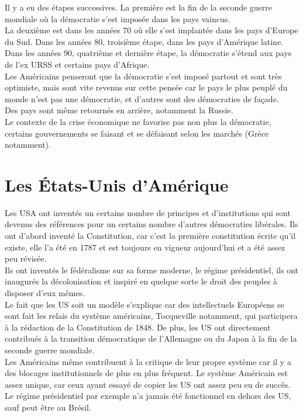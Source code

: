 \documentclass[10pt, a4paper, openany]{book}
\begin{document}
Il y a eu des étapes successives. La première est la fin de la seconde guerre mondiale où la démocratie s'est imposée dans les pays vaincus. \\
La deuxième est dans les années 70 où elle s'est implantée dans les pays d'Europe du Sud. Dans les années 80, troisième étape, dans les pays d'Amérique latine. Dans les années 90, quatrième et dernière étape, la démocratie s'étend aux pays de l'ex URSS et certains pays d'Afrique. \\
Les Américains penseront que la démocratie s'est imposé partout et sont très optimiste, mais sont vite revenus sur cette pensée car le pays le plus peuplé du monde n'est pas une démocratie, et d'autres sont des démocraties de façade. \\
Des pays sont même retournés en arrière, notamment la Russie. \\
Le contexte de la crise économique ne favorise pas non plus la démocratie, certains gouvernements se faisant et se défaisant selon les marchés (Grèce notamment). 

\chapter{Les États-Unis d'Amérique}

Les USA ont inventés un certains nombre de principes et d'institutions qui sont devenus des références pour un certains nombre d'autres démocraties libérales. Ils ont d'abord inventé la Constitution, car c'est la première constitution écrite qu'il existe, elle l'a été en 1787 et est toujours en vigueur aujourd'hui et a été assez peu révisée. \\
Ils ont inventés le fédéralisme sur sa forme moderne, le régime présidentiel, ils ont inaugurés la décolonisation et inspiré en quelque sorte le droit des peuples à disposer d'eux mêmes. \\
Le fait que les US soit un modèle s'explique car des intellectuels Européens se sont fait les relais du système américains, Tocqueville notamment, qui participera à la rédaction de la Constitution de 1848. De plus, les US ont directement contribués à la transition démocratique de l'Allemagne ou du Japon à la fin de la seconde guerre mondiale. \\
Les Américains même contribuent à la critique de leur propre système car il y a des blocages institutionnels de plus en plus fréquent. Le système Américain est assez unique, car ceux ayant essayé de copier les US ont assez peu eu de succès. Le régime présidentiel par exemple n'a jamais été fonctionnel en dehors des US, sauf peut être au Brésil. 
\end{document}

